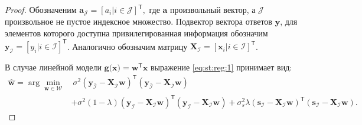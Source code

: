 \begin{proof}
Обозначеним $\mathbf{a}_{\mathcal{J}} = [a_i| i \in \mathcal{J}]^{\mathsf{T}},$ где $\mathbf{a}$ произвольный вектор, а $\mathcal{J}$ произвольное не пустое индексное множество. Подвектор вектора ответов $\mathbf{y}$, для элементов которого доступна привилегированная информация обозначим $\mathbf{y}_{\mathcal{I}} = [y_i| i \in \mathcal{I}]^{\mathsf{T}}$. Аналогично обозначим матрицу $\mathbf{X}_\mathcal{I}=[\mathbf{x}_{i}| i \in \mathcal{I}]^{\mathsf{T}}$.

В случае линейной модели $\mathbf{g}\bigr(\mathbf{x}\bigr) = \mathbf{w}^{\mathsf{T}}\mathbf{x}$ выражение \eqref{eq:st:reg:1} принимает вид:
\[
\label{eq:st:reg:2}
\begin{aligned}
\hat{\mathbf{w}} = \arg\min_{\mathbf{w}\in \mathcal{W}} &~ \sigma^2\left(\mathbf{y}_{\bar{\mathcal{I}}}-\mathbf{X}_{\bar{\mathcal{I}}}\mathbf{w}\right)^{\mathsf{T}}\left(\mathbf{y}_{\bar{\mathcal{I}}}-\mathbf{X}_{\bar{\mathcal{I}}}\mathbf{w}\right) \\
&+ \sigma^2\left(1-\lambda\right)\left(\mathbf{y}_{\mathcal{I}}-\mathbf{X}_{\mathcal{I}}\mathbf{w}\right)^{\mathsf{T}}\left(\mathbf{y}_{\mathcal{I}}-\mathbf{X}_{\mathcal{I}}\mathbf{w}\right) + \sigma^2_s\lambda\left(\mathbf{s}_{\mathcal{I}}-\mathbf{X}_{\mathcal{I}}\mathbf{w}\right)^{\mathsf{T}}\left(\mathbf{s}_{\mathcal{I}}-\mathbf{X}_{\mathcal{I}}\mathbf{w}\right).
\end{aligned}
\]


\end{proof}
